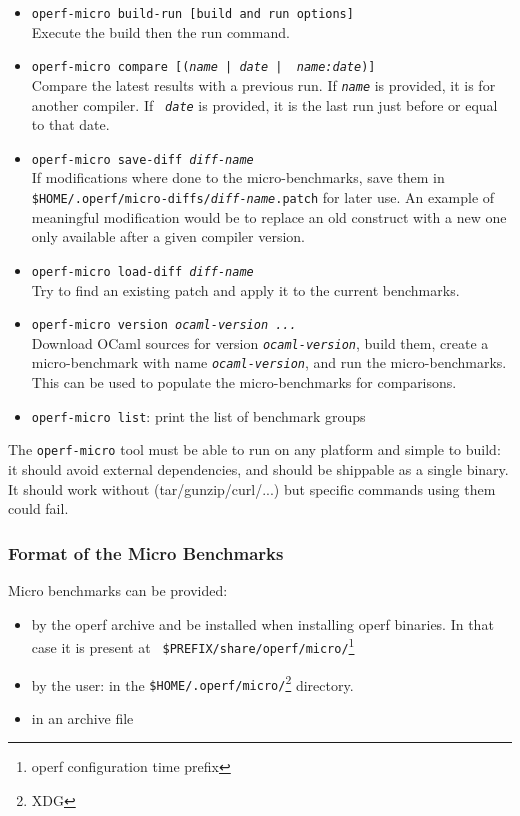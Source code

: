 \documentclass[11pt,a4paper]{article}
\begin{document}
\begin{itemize}
\item {\tt operf-micro build-run [build and run options]}\\
  Execute the build then the run command.
\item {\tt operf-micro compare [({\em name} | {\em date} | {\em
      name:date})]}\\ Compare the latest results with a previous run.
  If {\tt\em name} is provided, it is for another compiler. If {\tt\em
    date} is provided, it is the last run just before or equal to that
  date.
\item {\tt operf-micro save-diff {\em diff-name}}\\
  If modifications where done to the micro-benchmarks, save them in
  {\tt \$HOME/.operf/micro-diffs/{\em diff-name}.patch} for later use.
  An example of meaningful modification would be to replace an old
  construct with a new one only available after a given compiler version.
\item  {\tt operf-micro load-diff {\em diff-name}}\\
  Try to find an existing patch and apply it to the current benchmarks.
\item {\tt operf-micro version {\em ocaml-version ...}}\\ Download OCaml
  sources for version {\tt\em ocaml-version}, build them, create a
  micro-benchmark with name {\tt\em ocaml-version}, and run the
  micro-benchmarks. This can be used to populate the micro-benchmarks
  for comparisons.
\item {\tt operf-micro list}: print the list of benchmark groups
\end{itemize}

The {\tt operf-micro} tool must be able to run on any platform and
simple to build: it should avoid external dependencies, and should be
shippable as a single binary. It should work without
(tar/gunzip/curl/...) but specific commands using them could fail.

\subsubsection{Format of the Micro Benchmarks}

Micro benchmarks can be provided:\label{micro-dir-format}
\begin{itemize}
\item by the operf archive and be installed when installing operf
  binaries. In that case it is present at {\tt
    \$PREFIX/share/operf/micro/}\footnote{operf configuration time
    prefix}
\item by the user: in the {\tt \$HOME/.operf/micro/}\footnote{XDG}
  directory.
\item in an archive file
\end{itemize}
\end{document}
